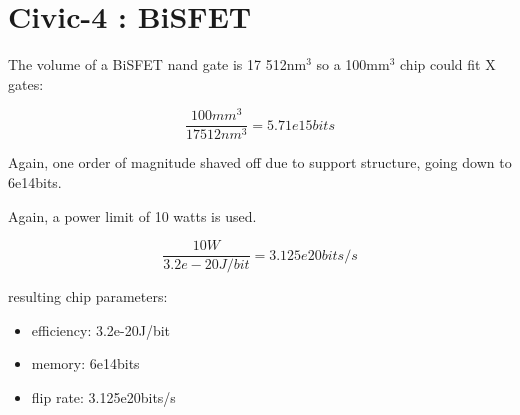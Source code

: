 \documentclass[a4paper]{article}
\begin{document}
	\section{Civic-4 : 	BiSFET}
	
	The volume of a BiSFET nand gate is 17 512nm$^3$ so a 100mm$^3$ chip could fit X gates:
	
	$$ \frac{100mm^3}{17512nm^3} = 5.71e15bits $$
	
	Again, one order of magnitude shaved off due to support structure, going down to 6e14bits.
	
	\medskip
	
	Again, a power limit of 10 watts is used.
	
	$$ \frac{10W}{3.2e-20J/bit} = 3.125e20bits/s$$
	
	resulting chip parameters:
	
	\begin{itemize}
		\item efficiency: 3.2e-20J/bit
		
		\item memory: 6e14bits
		
		\item flip rate: 3.125e20bits/s
	\end{itemize}
	
\end{document}
